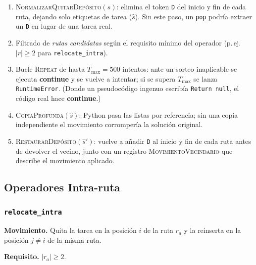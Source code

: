 \begin{enumerate}
    \item \textsc{NormalizarQuitarDepósito}$(s)$: elimina el token \texttt{D}
          del inicio y fin de cada ruta, dejando solo etiquetas de tarea
          ($\hat{s}$).  Sin este paso, un \texttt{pop} podría extraer un
          \texttt{D} en lugar de una tarea real.
    \item Filtrado de \emph{rutas candidatas} según el requisito mínimo del
          operador (p.\,ej.\ $|r| \geq 2$ para \texttt{relocate\_intra}).
    \item Bucle \textsc{Repeat} de hasta $T_{\max}=500$ intentos: ante un
          sorteo inaplicable se ejecuta \textbf{continue} y se vuelve a
          intentar; si se supera $T_{\max}$ se lanza \texttt{RuntimeError}.
          (Donde un pseudocódigo ingenuo escribía \texttt{Return null}, el
          código real hace \textbf{continue}.)
    \item \textsc{CopiaProfunda}$(\hat{s})$: Python pasa las listas por
          referencia; sin una copia independiente el movimiento corrompería
          la solución original.
    \item \textsc{RestaurarDepósito}$(\hat{s}')$: vuelve a añadir \texttt{D}
          al inicio y fin de cada ruta antes de devolver el vecino, junto
          con un registro \textsc{MovimientoVecindario} que describe el
          movimiento aplicado.
\end{enumerate}

\subsection{Operadores Intra-ruta}
\label{subsec:intra-operators}

\subsubsection{\texttt{relocate\_intra}}
\label{sssec:relocate-intra}

\textbf{Movimiento.}
Quita la tarea en la posición $i$ de la ruta $r_a$ y la reinserta en la
posición $j \neq i$ de la misma ruta.

\textbf{Requisito.} $|r_a| \geq 2$.

